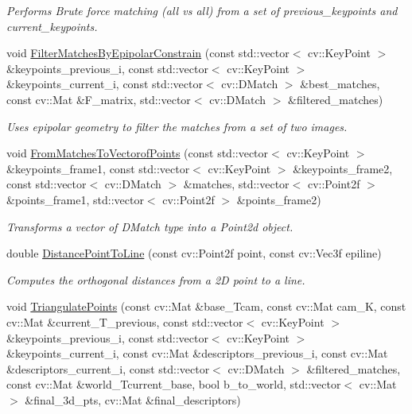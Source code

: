 \begin{DoxyCompactItemize}
\begin{DoxyCompactList}\small\item\em Performs Brute force matching (all vs all) from a set of previous\+\_\+keypoints and current\+\_\+keypoints. \end{DoxyCompactList}\item 
void \hyperlink{classcoldetector_1_1CollisionDetector_a3464d9594b80dcda080bff19f7f9f9e3}{Filter\+Matches\+By\+Epipolar\+Constrain} (const std\+::vector$<$ cv\+::\+Key\+Point $>$ \&keypoints\+\_\+previous\+\_\+i, const std\+::vector$<$ cv\+::\+Key\+Point $>$ \&keypoints\+\_\+current\+\_\+i, const std\+::vector$<$ cv\+::\+D\+Match $>$ \&best\+\_\+matches, const cv\+::\+Mat \&F\+\_\+matrix, std\+::vector$<$ cv\+::\+D\+Match $>$ \&filtered\+\_\+matches)
\begin{DoxyCompactList}\small\item\em Uses epipolar geometry to filter the matches from a set of two images. \end{DoxyCompactList}\item 
void \hyperlink{classcoldetector_1_1CollisionDetector_a2027843784c5be77bebbad2785de51a7}{From\+Matches\+To\+Vectorof\+Points} (const std\+::vector$<$ cv\+::\+Key\+Point $>$ \&keypoints\+\_\+frame1, const std\+::vector$<$ cv\+::\+Key\+Point $>$ \&keypoints\+\_\+frame2, const std\+::vector$<$ cv\+::\+D\+Match $>$ \&matches, std\+::vector$<$ cv\+::\+Point2f $>$ \&points\+\_\+frame1, std\+::vector$<$ cv\+::\+Point2f $>$ \&points\+\_\+frame2)
\begin{DoxyCompactList}\small\item\em Transforms a vector of D\+Match type into a Point2d object. \end{DoxyCompactList}\item 
double \hyperlink{classcoldetector_1_1CollisionDetector_a27a359ba9c0c7b6966211ab35326179a}{Distance\+Point\+To\+Line} (const cv\+::\+Point2f point, const cv\+::\+Vec3f epiline)
\begin{DoxyCompactList}\small\item\em Computes the orthogonal distances from a 2D point to a line. \end{DoxyCompactList}\item 
void \hyperlink{classcoldetector_1_1CollisionDetector_a9b07097107a9acbf91bb5e338998d2c6}{Triangulate\+Points} (const cv\+::\+Mat \&base\+\_\+\+Tcam, const cv\+::\+Mat cam\+\_\+K, const cv\+::\+Mat \&current\+\_\+\+T\+\_\+previous, const std\+::vector$<$ cv\+::\+Key\+Point $>$ \&keypoints\+\_\+previous\+\_\+i, const std\+::vector$<$ cv\+::\+Key\+Point $>$ \&keypoints\+\_\+current\+\_\+i, const cv\+::\+Mat \&descriptors\+\_\+previous\+\_\+i, const cv\+::\+Mat \&descriptors\+\_\+current\+\_\+i, const std\+::vector$<$ cv\+::\+D\+Match $>$ \&filtered\+\_\+matches, const cv\+::\+Mat \&world\+\_\+\+Tcurrent\+\_\+base, bool b\+\_\+to\+\_\+world, std\+::vector$<$ cv\+::\+Mat $>$ \&final\+\_\+3d\+\_\+pts, cv\+::\+Mat \&final\+\_\+descriptors)

\end{DoxyCompactItemize}
